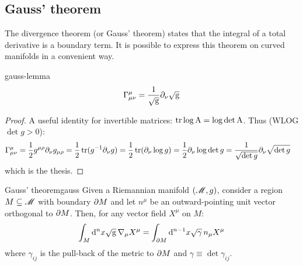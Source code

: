 \subsection{Gauss' theorem}

The divergence theorem (or Gauss' theorem) states that the integral of a total derivative is a boundary term. It is possible to express this theorem on curved manifolds in a convenient way.

\begin{lemma}[before upper = {\tcbtitle}]{}{gauss-lemma}
  \begin{equation}
    \Gamma^\mu_{\mu \nu} = \frac{1}{\sqrt{\mathrm{g}}} \partial_\nu \sqrt{\mathrm{g}}
  \end{equation}
\end{lemma}

\begin{proofbox}
  \begin{proof}
    A useful identity for invertible matrices: $ \operatorname{tr} \log \mathrm{A} = \log \det \mathrm{A} $. Thus (WLOG $ \det g > 0 $):
    \begin{equation*}
      \begin{split}
        \Gamma^\mu_{\mu \nu}
        &= \frac{1}{2} g^{\mu \rho} \partial_\nu g_{\mu \rho} = \frac{1}{2} \operatorname{tr} (g^{-1} \partial_\nu g) = \frac{1}{2} \operatorname{tr} (\partial_\nu \log g) = \frac{1}{2} \partial_\nu \log \det g = \frac{1}{\sqrt{\det g}} \partial_\nu \sqrt{\det g}
      \end{split}
    \end{equation*}
    which is the thesis.
  \end{proof}
\end{proofbox}

\begin{theorem}{Gauss' theorem}{gauss}
  Given a Riemannian manifold $ (\mathscr{M},g) $, consider a region $ M \subseteq \mathscr{M} $ with boundary $ \partial M $ and let $ n^\mu $ be an outward-pointing unit vector orthogonal to $ \partial M $. Then, for any vector field $ X^\mu $ on $ M $:
  \begin{equation}
    \int_M \mathrm{d}^n x \sqrt{\mathrm{g}}\, \nabla_\mu X^\mu = \int_{\partial M} \mathrm{d}^{n-1} x \sqrt{\gamma}\, n_\mu X^\mu
    \label{eq:gauss-theorem}
  \end{equation}
  where $ \gamma_{ij} $ is the pull-back of the metric to $ \partial M $ and $ \gamma \equiv \det \gamma_{ij} $.
\end{theorem}

